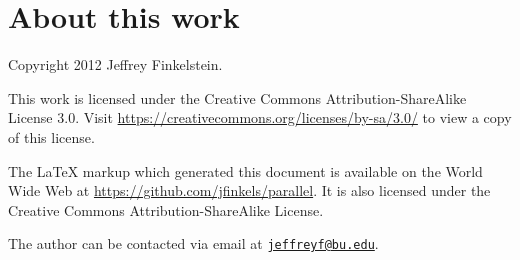 \documentclass[]{article}
\theoremstyle{plain}
\theoremstyle{definition}
\newcommand{\email}[1]{\href{mailto:#1}{\nolinkurl{#1}}}
\begin{document}
\section{About this work}

Copyright 2012 Jef{}frey Finkelstein.

This work is licensed under the Creative Commons Attribution-ShareAlike License 3.0.
Visit \mbox{\url{https://creativecommons.org/licenses/by-sa/3.0/}} to view a copy of this license.

The \LaTeX{} markup which generated this document is available on the World Wide Web at \mbox{\url{https://github.com/jfinkels/parallel}}.
It is also licensed under the Creative Commons Attribution-ShareAlike License.

The author can be contacted via email at \email{jeffreyf@bu.edu}.



\end{document}
